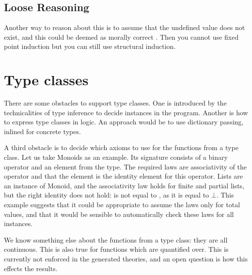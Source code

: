 \subsection{Loose Reasoning}

Another way to reason about this is to assume that the undefined value
does not exist, and this could be deemed as morally correct
\cite{fastandloose}. Then you cannot use fixed point induction but you
can still use structural induction.


%

%

\section{Type classes}
\label{sec:typeclasses}

There are some obstacles to support type classes. One is introduced by
the technicalities of type inference to decide instances in the
program. Another is how to express type classes in logic. An approach
would be to use dictionary passing, inlined for concrete types.

A third obstacle is to decide which axioms to use for the functions
from a type class. Let us take Monoids as an example. Its signature
consists of a binary operator and an element from the type. The
required laws are associativity of the operator and that the element
is the identity element for this operator. Lists are an instance of
Monoid, and the associativity law holds for finite and partial lists,
but the right identity does not hold: \hs{$\bot$ ++ []} is not equal
to \hs{[]}, as it is equal to $\bot$. This example suggests that it
could be appropriate to assume the laws only for total values, and
that it would be sensible to automatically check these laws for all
instances.

We know something else about the functions from a type class: they are
all continuous. This is also true for functions which are quantified
over. This is currently not enforced in the generated theories, and an
open question is how this effects the results.

